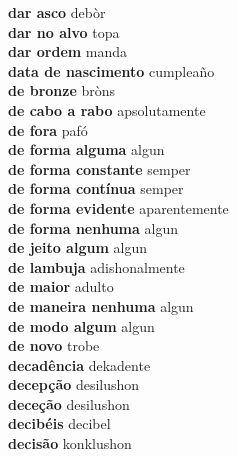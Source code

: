 \textbf{ dar asco  } debòr \\
\textbf{ dar no alvo  } topa \\
\textbf{ dar ordem  } manda \\
\textbf{ data de nascimento  } cumpleaño \\
\textbf{ de bronze  } bròns \\
\textbf{ de cabo a rabo  } apsolutamente \\
\textbf{ de fora  } pafó \\
\textbf{ de forma alguma  } algun \\
\textbf{ de forma constante  } semper \\
\textbf{ de forma contínua  } semper \\
\textbf{ de forma evidente  } aparentemente \\
\textbf{ de forma nenhuma  } algun \\
\textbf{ de jeito algum  } algun \\
\textbf{ de lambuja  } adishonalmente \\
\textbf{ de maior  } adulto \\
\textbf{ de maneira nenhuma  } algun \\
\textbf{ de modo algum  } algun \\
\textbf{ de novo  } trobe \\
\textbf{ decadência  } dekadente \\
\textbf{ decepção  } desilushon \\
\textbf{ deceção  } desilushon \\
\textbf{ decibéis  } decibel \\
\textbf{ decisão  } konklushon \\
